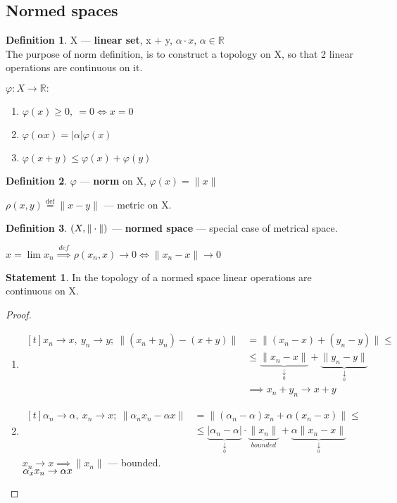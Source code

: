 \documentclass[12pt, fleqn]{article}
\theoremstyle{definition}
\newtheorem*{defn}{Definition}
\theoremstyle{break}
\theoremstyle{theorem}
\newtheorem{stm}{Statement}[section]
\renewcommand\leq{\leqslant}
\renewcommand\geq{\geqslant}
\renewcommand\phi{\varphi}
\newcommand{\defeq}{\overset{\text{def}}{=}}
\newcommand{\tendsto}[2]{\underbrace{#1}_{\underset{#2}{\downarrow}}}
\newcommand{\R}{\mathbb{R}}
\begin{document}
\subsection{Normed spaces}
\begin{defn}
  X --- \textbf{linear set}, x + y, $\alpha \cdot x$, $\alpha \in \R$ \\
  The purpose of norm definition, is to construct a topology on X, so that 2 linear operations are continuous on it.
\end{defn}
$\phi: X \to \R\colon$
\begin{enumerate}
\item $\phi(x) \geq 0,\ = 0 \iff x = 0$
\item $\phi(\alpha x) = |\alpha| \phi(x)$
\item $\phi(x + y) \leq \phi(x) + \phi(y)$
\end{enumerate}
\begin{defn}
  $\phi$ --- \textbf{norm} on X, $\phi(x) = \|x\|$
\end{defn}
$\rho(x, y) \defeq \|x - y\|$ --- metric on X. 
\begin{defn}
  $\\(X, \|\cdot\|)$ --- \textbf{normed space} --- special case of metrical space.
\end{defn}
\noindent
$x = \lim x_n \overset{def}{\implies} \rho(x_n, x) \to 0 \iff \|x_n - x\| \to 0$
\begin{stm}
  In the topology of a normed space linear operations are continuous on X.
\end{stm}
\begin{proof}
  \begin{enumerate}
  \item 
    $\begin{aligned}[t]
      x_n \to x,\ y_n \to y;\ \|(x_n + y_n) - (x + y)\| & = \|(x_n - x) + (y_n - y)\|  \leq \\ 
      & \leq  \tendsto{\|x_n - x\|}{0} + \tendsto{\|y_n - y\|}{0} \\
      & \implies x_n + y_n \to x + y
    \end{aligned}$
  \item 
    $\begin{aligned}[t]
       \alpha_n \to \alpha,\ x_n \to x;\ \|\alpha_n x_n - \alpha x\| & =
        \|(\alpha_n - \alpha)x_n + \alpha(x_n - x)\| \leq \\
        & \leq \tendsto{|\alpha_n - \alpha|}{0} \cdot \underbrace{\|x_n\|}_{bounded} + \tendsto{\alpha\|x_n - x\|}{0}
    \end{aligned}$ \\
    $x_n \to x \implies \|x_n\|$ --- bounded. \\
    $\alpha_x x_n \to \alpha x\qedhere$
  \end{enumerate}
\end{proof}
\end{document}
